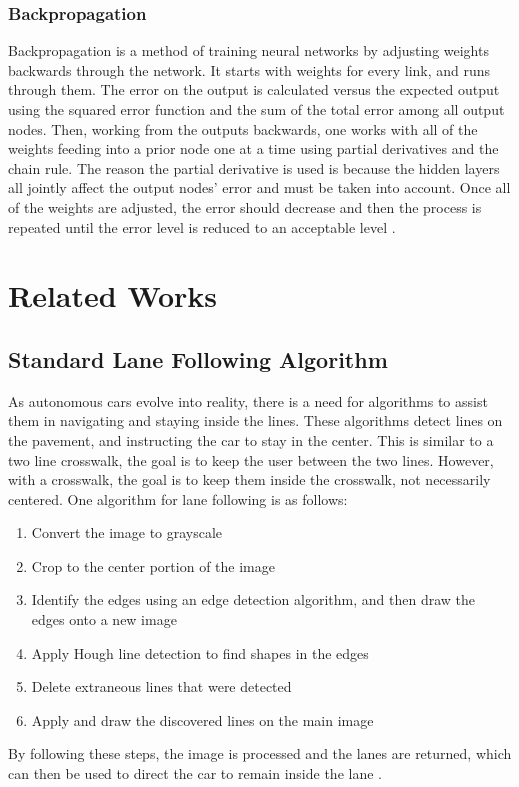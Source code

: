 \documentclass[12pt]{ucthesis}
\begin{document}
\subsection{Backpropagation}
\label{Backpropagation Neural Network}
Backpropagation is a method of training neural networks by adjusting weights backwards through the network. It starts with weights for every link, and runs through them. The error on the output is calculated versus the expected output using the squared error function and the sum of the total error among all output nodes. Then, working from the outputs backwards, one works with all of the weights feeding into a prior node one at a time using partial derivatives and the chain rule. The reason the partial derivative is used is because the hidden layers all jointly affect the output nodes' error and must be taken into account. Once all of the weights are adjusted, the error should decrease and then the process is repeated until the error level is reduced to an acceptable level \cite{backpropositionPaper}. 

\chapter{Related Works}
\label{Related Works}

\section{Standard Lane Following Algorithm}
As autonomous cars evolve into reality, there is a need for algorithms
to assist them in navigating and staying inside the lines. These
algorithms detect lines on the pavement, and
instructing the car to stay in the center. This is similar to
a two line crosswalk, the goal is to keep the user between the two
lines. However, with a crosswalk, the goal is to keep them inside the crosswalk, not necessarily centered.
One algorithm for lane following is as follows:
\begin{enumerate}
  \item Convert the image to grayscale
  \item Crop to the center portion of the image
  \item Identify the edges using an edge detection algorithm, and then draw the
  edges onto a new image
  \item Apply Hough line detection to find shapes in the edges \cite{HoughTransform}
  \item Delete extraneous lines that were detected
  \item Apply and draw the discovered lines on the main image
\end{enumerate}
By following these steps, the image is processed and the lanes are returned,
which can then be used to direct the car to remain inside the lane \cite{SingleLane1}.
\end{document}
